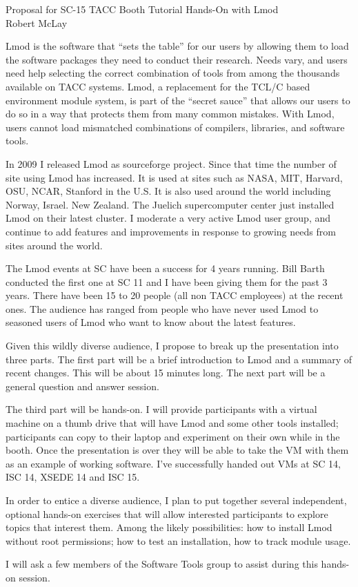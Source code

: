 \documentclass[12pt]{article}
\begin{document}
\begin{center}
Proposal for SC-15 TACC Booth Tutorial Hands-On with Lmod \\
Robert McLay
\end{center}

Lmod is the software that ``sets the table'' for our users by allowing
them to load the software packages they need to conduct their
research.  Needs vary, and users need help selecting the correct
combination of tools from among the thousands available on TACC
systems.  Lmod, a replacement for the TCL/C based environment module
system, is part of the ``secret sauce'' that allows our users to do so
in a way that protects them from many common mistakes.  With Lmod,
users cannot load mismatched combinations of compilers, libraries, and
software tools.

In 2009 I released Lmod as sourceforge project.  Since that time the
number of site using Lmod has increased.  It is used at sites such as
NASA, MIT, Harvard, OSU, NCAR, Stanford in the U.S. It is also used
around the world including Norway, Israel. New Zealand. The Juelich
supercomputer center just installed Lmod on their latest cluster. I
moderate a very active Lmod user group, and continue to add features
and improvements in response to growing needs from sites around the
world.

The Lmod events at SC have been a success for 4 years running.  Bill
Barth conducted the first one at SC 11 and I have been giving them for
the past 3 years.  There have been 15 to 20 people (all non TACC
employees) at the recent ones.  The audience has ranged from people
who have never used Lmod to seasoned users of Lmod who want to know
about the latest features.

Given this wildly diverse audience, I propose to break up the
presentation into three parts.   The first part will be a brief
introduction to Lmod and a summary of recent changes. This will be
about 15 minutes long.  The next part will be a general question and
answer session.

The third part will be hands-on.  I will provide participants with a
virtual machine on a thumb drive that will have Lmod and some other
tools installed; participants can copy to their laptop and experiment
on their own while in the booth.  Once the presentation is over they
will be able to take the VM with them as an example of working
software.  I've successfully handed out VMs at SC 14, ISC 14, XSEDE 14
and ISC 15.

In order to entice a diverse audience, I plan to put together several
independent, optional hands-on exercises that will allow interested
participants to explore topics that interest them. Among the likely
possibilities: how to install Lmod without root permissions; how to
test an installation, how to track module usage.

I will ask a few members of the Software Tools group to assist during
this hands-on session.
\end{document}
